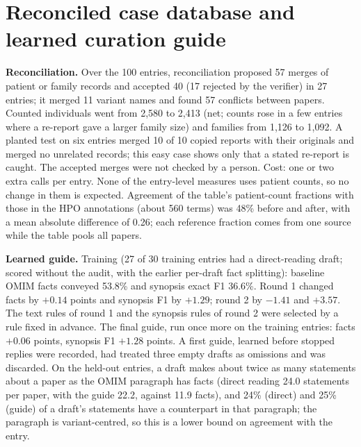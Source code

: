 \documentclass{article} %
\begin{document}
\section{Reconciled case database and learned curation guide}
\label{app:addons}
\textbf{Reconciliation.} Over the 100 entries, reconciliation proposed 57 merges of patient or family records and accepted 40 (17 rejected by the verifier) in 27 entries; it merged 11 variant names and found 57 conflicts between papers. Counted individuals went from 2,580 to 2,413 (net; counts rose in a few entries where a re-report gave a larger family size) and families from 1,126 to 1,092. A planted test on six entries merged 10 of 10 copied reports with their originals and merged no unrelated records; this easy case shows only that a stated re-report is caught. The accepted merges were not checked by a person. Cost: one or two extra calls per entry. None of the entry-level measures uses patient counts, so no change in them is expected. Agreement of the table's patient-count fractions with those in the HPO annotations (about 560 terms) was 48\% before and after, with a mean absolute difference of 0.26; each reference fraction comes from one source while the table pools all papers.

\textbf{Learned guide.} Training (27 of 30 training entries had a direct-reading draft; scored without the audit, with the earlier per-draft fact splitting): baseline OMIM facts conveyed 53.8\% and synopsis exact F1 36.6\%. Round 1 changed facts by $+0.14$ points and synopsis F1 by $+1.29$; round 2 by $-1.41$ and $+3.57$. The text rules of round 1 and the synopsis rules of round 2 were selected by a rule fixed in advance. The final guide, run once more on the training entries: facts $+0.06$ points, synopsis F1 $+1.28$ points. A first guide, learned before stopped replies were recorded, had treated three empty drafts as omissions and was discarded. On the held-out entries, a draft makes about twice as many statements about a paper as the OMIM paragraph has facts (direct reading 24.0 statements per paper, with the guide 22.2, against 11.9 facts), and 24\% (direct) and 25\% (guide) of a draft's statements have a counterpart in that paragraph; the paragraph is variant-centred, so this is a lower bound on agreement with the entry.
\end{document}
